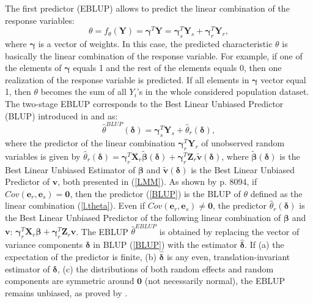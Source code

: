 The first predictor (EBLUP) allows to predict the linear combination of the response variables:
\begin{equation} \label{l.theta}
\theta = f_{\theta}(\mathbf{Y}) = \boldsymbol{\gamma}^T \mathbf{Y}= \boldsymbol{\gamma}_s^T \mathbf{Y}_s + \boldsymbol{\gamma}_r^T \mathbf{Y}_r,
\end{equation}
where $\boldsymbol{\gamma}$ is a vector of weights. In this case, the predicted characteristic $\theta$ is basically the linear combination of the response variable. For example, if one of the elements of $\boldsymbol{\gamma}$ equals 1 and the rest of the elements equals 0, then one realization of the response variable is predicted. If all elements in $\boldsymbol{\gamma}$ vector equal 1, then $\theta$ becomes the sum of all $Y_i$'s in the whole considered population dataset. The two-stage EBLUP corresponds to the Best Linear Unbiased Predictor (BLUP) introduced in \cite{henderson1950estimation} and \cite{royall1976linear} as:
\begin{equation} \label{BLUP}
	\hat{\theta}^{BLUP} (\pmb{\delta}) = {\boldsymbol{\gamma}}_s^T \mathbf{Y}_s  + \hat{\theta}_r(\pmb{\delta}),
\end{equation}
where the predictor of the linear combination $\boldsymbol{\gamma}_r^T \mathbf{Y}_r$ of unobserved random variables is given by $\hat{\theta}_r(\pmb{\delta})={\boldsymbol{\gamma }}_r^T {{\mathbf{X}}_r}{\tilde{\boldsymbol{\beta}} }(\pmb{\delta}) +\boldsymbol{\gamma }_r^T{\mathbf{Z}}_r{\mathbf{\tilde{v}}}(\pmb{\delta})$, where $\tilde{\boldsymbol{\beta}}(\pmb{\delta})$ is the Best Linear Unbiased Estimator of $\boldsymbol{\beta}$ and $\tilde{\mathbf{v}}(\pmb{\delta})$ is the Best Linear Unbiased Predictor of $\mathbf{v}$, both presented in (\ref{LMM}). As shown by \cite{zadlo2017EBLUP} p. 8094, if $Cov(\mathbf{e}_r, \mathbf{e}_s)=\mathbf{0}$, then the predictor (\ref{BLUP}) is the BLUP of $\theta$ defined as the linear combination (\ref{l.theta}). Even if $Cov(\mathbf{e}_r, \mathbf{e}_s) \neq \mathbf{0}$, the predictor $\hat{\theta}_r(\pmb{\delta})$ is the Best Linear Unbiased Predictor of the following linear combination of $\boldsymbol{\beta}$ and $\mathbf{v}$: ${\boldsymbol{\gamma }}_r^T{{\mathbf{X}}_r}{ {\boldsymbol{\beta}} } +\boldsymbol{\gamma }_r^T{\mathbf{Z}}_r{\mathbf{{v}}}$. The EBLUP $\hat\theta^{EBLUP}$ is obtained by replacing the vector of variance components $\pmb{\delta}$ in BLUP (\ref{BLUP}) with the estimator $\hat{\pmb{\delta}}$. If (a) the expectation of the predictor is finite, (b) $\hat{\pmb{\delta}}$ is any even, translation-invariant estimator of $\pmb{\delta}$, (c) the distributions of both random effects and random components are symmetric around $\mathbf{0}$ (not necessarily normal), the EBLUP remains unbiased, as proved by \cite{kackar1981unbiasedness}.

